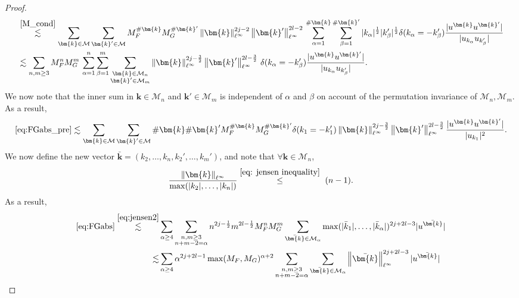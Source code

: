 \documentclass[a4paper,10pt,reqno]{article}
\theoremstyle{definition}
\theoremstyle{plain}
\theoremstyle{plain}
\theoremstyle{definition}
\theoremstyle{plain}
\theoremstyle{plain}
\theoremstyle{plain}
\theoremstyle{definition}
\theoremstyle{definition}
\newcommand{\norm}[1]{\left\lVert #1 \right\rVert}
\def \M{\mathcal{M}}
\def \k{\bm{k}}
\begin{document}
\begin{proof}
\begin{align}
& \stackrel{\eqref{M_cond}}{\lesssim} \sum_{\k \in \M} \sum_{\k' \in \M} M_F^{\#\k} M_G^{\#\k'} \norm{\k}_{\ell^{\infty}}^{2j-2} \norm{\k'}_{\ell^{\infty}}^{2l-2} \, \sum_{\alpha=1}^{\#\k} \sum_{\beta=1}^{\#\k'} |k_{\alpha}|^{\frac{1}{2}} |k_{\beta}'|^{\frac{1}{2}} \delta(k_{\alpha}=-k_{\beta}') \frac{\lvert u^{\k} u^{\k'} \rvert}{\lvert u_{k_\alpha} u_{k_\beta'} \rvert} \nonumber \\
& \lesssim \sum_{n,m\geq 3} M_F^n M_G^m  \, \sum_{\alpha=1}^n \sum_{\beta=1}^m 
\sum_{\substack{\k\in \M_n \\ \k' \in \M_m} } \norm{\k}_{\ell^{\infty}}^{2j-\frac32} \norm{\k'}_{\ell^{\infty}}^{2l-\frac32}\,
\delta(k_{\alpha}=-k_{\beta}') \frac{\lvert u^{\k} u^{\k'} \rvert}{\lvert u_{k_\alpha} u_{k_\beta'} \rvert}. \label{eq:FGabs_pre} \end{align}
We now note that the inner sum in $\k\in \M_n$ and $\k' \in \M_m$ is independent of $\alpha$ and $\beta$ on account of the permutation invariance of $\M_n,\M_m$. 
As a result,
\begin{equation}\label{eq:FGabs}
\eqref{eq:FGabs_pre}\lesssim \sum_{\k \in \M} \sum_{\k' \in \M} \#\k \#\k' M_F^{\#\k} M_G^{\#\k'} \delta(k_1=-k_1') \norm{\k}_{\ell^{\infty}}^{2j-\frac{3}{2}} \norm{\k'}_{\ell^{\infty}}^{2l-\frac{3}{2}} \frac{|u^{\k} u^{\k'}|}{|u_{k_1}|^2}.
\end{equation}
We now define the new vector $\bar{\k} = (k_2,\ldots,k_n,k_2',\ldots,k_m')$, and note that $\forall \k \in \M_n$,
\begin{equation}\label{eq:jensen2}
   \frac{\norm{\k}_{\ell^{\infty}}}{\max ( |k_2|,\ldots,|k_{n}| ) }
\stackrel{\eqref{eq: jensen inequality}}{\le}\ (n-1).
\end{equation}
As a result,
\[
\begin{split}
\eqref{eq:FGabs} \stackrel{\eqref{eq:jensen2}}{\lesssim} & \sum_{\alpha \ge 4} \sum_{ \substack{ n,m \ge 3 \\ n+m-2=\alpha } } n^{2j-\frac12} m^{2l-\frac12} M_F^n M_G^m \sum_{\bar{\k} \in \M_{\alpha}} \max ( |\bar{k}_1|,\ldots,|\bar{k}_{\alpha}| )^{2j+2l-3} |u^{\bar{\k}}|\\
\lesssim& \sum_{\alpha \ge 4} \alpha^{2j+2l-1} \max( M_F,M_G)^{\alpha+2}\sum_{ \substack{ n,m \ge 3 \\ n+m-2=\alpha } } \sum_{\bar{\k} \in \M_{\alpha}} \norm{\bar{\k}}_{\ell^{\infty}}^{2j+2l-3} |u^{\bar{\k}}| \\

\end{split}\]
\end{proof}
\end{document}
